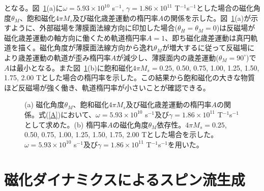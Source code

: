 となる。図~\ref{Aspect}(a)に$\omega=5.93\times 10^{10}$ s$^{-1}$, $\gamma=1.86\times 10^{11}$ T$^{-1}$s$^{-1}$とした場合の磁化角度$\theta_M$、飽和磁化$4\pi M_s $及び磁化歳差運動の楕円率$A$の関係を示した。図~\ref{Aspect}(a)が示すように、外部磁場を薄膜面法線方向に印加した場合($\theta_H=\theta_M=0$)は反磁場が磁化歳差運動の軸方向に働くため軌道楕円率$A=1$、即ち磁化歳差運動は真円軌道を描く。磁化角度が薄膜面法線方向から逸れ$\theta_M$が増大するに従って反磁場により歳差運動の軌道が歪み楕円率$A$が減少し、薄膜面内の歳差運動($\theta_M=90^\circ$)で$A$は最小となる。また図~\ref{Aspect}(b)に飽和磁化$4\pi M_s=0.25$, 0.50, 0.75, 1.00, 1.25, 1.50, 1.75, 2.00 Tとした場合の楕円率を示した。この結果から飽和磁化の大きな物質ほど反磁場が強く働き、軌道楕円率が小さいことが確認できる。






\begin{figure}[tbp]
\begin{center}
\caption{(a) 磁化角度$\theta_M$、飽和磁化$4\pi M_s $及び磁化歳差運動の楕円率$A$の関係。式(\ref{A})において、$\omega=5.93\times 10^{10}$ s$^{-1}$及び$\gamma=1.86\times 10^{11}$ T$^{-1}$s$^{-1}$として求めた。(b) 楕円率$A$の磁化角度$\theta_M$依存性。$4\pi M_s=0.25$, 0.50, 0.75, 1.00, 1.25, 1.50, 1.75, 2.00 Tとした場合を示した。$\omega=5.93\times 10^{10}$ s$^{-1}$及び$\gamma=1.86\times 10^{11}$ T$^{-1}$s$^{-1}$を用いた。}
\label{Aspect}
\end{center}
\end{figure}











\section{磁化ダイナミクスによるスピン流生成}
